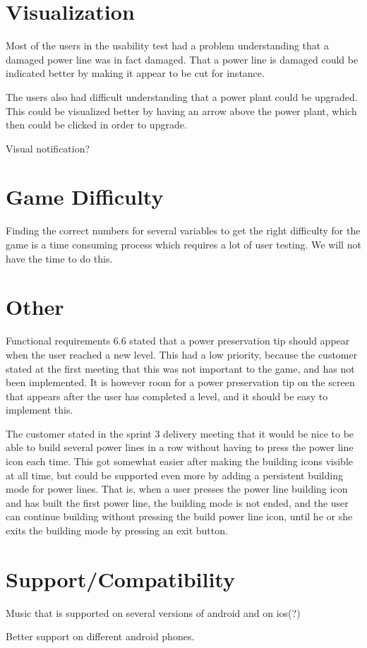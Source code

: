 \section*{Visualization}

Most of the users in the usability test had a problem understanding that a damaged power 
line was in fact damaged. That a power line is damaged could be indicated better by making 
it appear to be cut for instance.

The users also had difficult understanding that a power plant could be upgraded. This could 
be visualized better by having an arrow above the power plant, which then could be clicked in 
order to upgrade.

Visual notification?

\section*{Game Difficulty}

Finding the correct numbers for several variables to get the right difficulty for the game is a time consuming process which requires a lot of user testing. We will not have the time to do this.

\section*{Other}

Functional requirements 6.6 stated that a power preservation tip should appear when the user 
reached a new level. This had a low priority, because the customer stated at the first meeting 
that this was not important to the game, and has not been implemented. It is however room for a 
power preservation tip on the screen that appears after the user has completed a level, and it 
should be easy to implement this.

The customer stated in the sprint 3 delivery meeting that it would be nice to be able to build 
several power lines in a row without having to press the power line icon each time. This got 
somewhat easier after making the building icons visible at all time, but could be supported even 
more by adding a persistent building mode for power lines. That is, when a user presses the power 
line building icon and has built the first power line, the building mode is not ended, and the user 
can continue building without pressing the build power line icon, until he or she exits the building 
mode by pressing an exit button.

\section*{Support/Compatibility}

Music that is supported on several versions of android and on ios(?)

Better support on different android phones.
